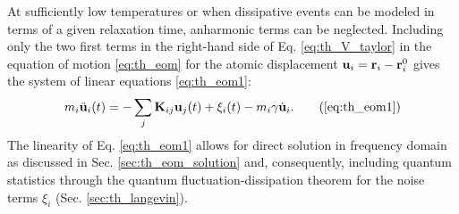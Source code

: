 
At sufficiently low temperatures or when dissipative events can be modeled in terms of a given relaxation time, anharmonic terms can be neglected. Including only the two first terms in the right-hand side of Eq. \eqref{eq:th_V_taylor} in the equation of motion \eqref{eq:th_eom} for the atomic displacement $\mathbf{u}_i=\mathbf{r}_i-\mathbf{r}_i^0$ gives the system of linear equations \eqref{eq:th_eom1}:
\begin{equation}
 m_i \ddot{\bu}_i(t) =  - \sum_j \bb{K}_{ij}\bb{u}_j(t) + \xi_i(t) - m_i \gamma \dot{\bu}_i.  \tag{\ref{eq:th_eom1}}
\end{equation}
The linearity of Eq. \eqref{eq:th_eom1} allows for direct solution in frequency domain as discussed in Sec. \ref{sec:th_eom_solution} and, consequently, including quantum statistics through the quantum fluctuation-dissipation theorem for the noise terms $\xi_i$ (Sec. \ref{sec:th_langevin}). 



